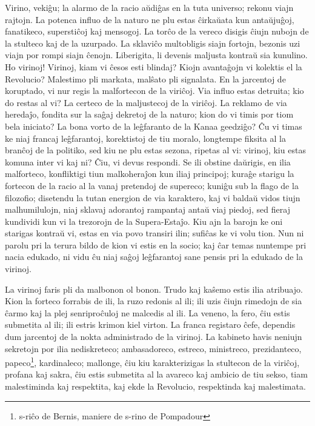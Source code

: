 \documentclass{book}
\begin{document}
Virino, vekiĝu; la alarmo de la racio aŭdiĝas en la tuta
universo; rekonu viajn rajtojn. La potenca influo de la naturo ne
plu estas ĉirkaŭata kun antaŭjuĝoj, fanatikeco, superstiĉoj kaj
mensogoj. La torĉo de la vereco disigis ĉiujn nubojn de la
stulteco kaj de la uzurpado. La sklaviĉo multobligis siajn
fortojn, bezonis uzi viajn por rompi siajn ĉenojn. Liberigita, li
devenis maljusta kontraŭ sia kunulino. Ho virinoj! Virinoj, kiam
vi ĉesos esti blindaj? Kiojn avantaĝojn vi kolektis el la
Revolucio? Malestimo pli markata, malŝato pli signalata. En la
jarcentoj de koruptado, vi nur regis la malfortecon de la
viriĉoj. Via influo estas detruita; kio do restas al vi? La
certeco de la maljustecoj de la viriĉoj. La reklamo de via
heredaĵo, fondita sur la saĝaj dekretoj de la naturo; kion do vi
timis por tiom bela iniciato? La bona vorto de la leĝfaranto de
la Kanaa geedziĝo? Ĉu vi timas ke niaj francaj leĝfarantoj,
korektistoj de tiu moralo, longtempe fiksita al la branĉoj de la
politiko, sed kiu ne plu estas sezona, ripetas al vi: virinoj,
kiu estas komuna inter vi kaj ni? Ĉiu, vi devus respondi. Se ili
obstine daŭrigis, en ilia malforteco, konfliktigi tiun
malkoheraĵon kun iliaj principoj; kuraĝe starigu la fortecon de
la racio al la vanaj pretendoj de supereco; kuniĝu sub la flago
de la filozofio; disetendu la tutan energion de via karaktero,
kaj vi baldaŭ vidos tiujn malhumilulojn, niaj sklavaj adorantoj
rampantaj antaŭ viaj piedoj, sed fieraj kundividi kun vi la
trezorojn de la Supera-Estaĵo. Kiu ajn la barojn ke oni starigas
kontraŭ vi, estas en via povo transiri ilin; sufiĉas ke vi volu
tion. Nun ni parolu pri la terura bildo de kion vi estis en la
socio; kaj ĉar temas nuntempe pri nacia edukado, ni vidu ĉu niaj
saĝoj leĝfarantoj sane pensis pri la edukado de la virinoj.

La virinoj faris pli da malbonon ol bonon. Trudo kaj kaŝemo estis
ilia atribuajo. Kion la forteco forrabis de ili, la ruzo redonis
al ili; ili uzis ĉiujn rimedojn de sia ĉarmo kaj la plej
senriproĉuloj ne malcedis al ili. La veneno, la fero, ĉiu estis
submetita al ili; ili estris krimon kiel virton. La franca
registaro ĉefe, dependis dum jarcentoj de la nokta administrado
de la virinoj. La kabineto havis neniujn sekretojn por ilia
nediskreteco; ambasadoreco, estreco, ministreco, prezidanteco,
papeco\footnote{s-riĉo de Bernis, maniere de s-rino de
Pompadour}, kardinaleco; mallonge, ĉiu kiu karakterizigas la
stultecon de la viriĉoj, profana kaj sakra, ĉiu estis submetita
al la avareco kaj ambicio de tiu sekso, tiam malestiminda kaj
respektita, kaj ekde la Revolucio, respektinda kaj malestimata.
\end{document}
